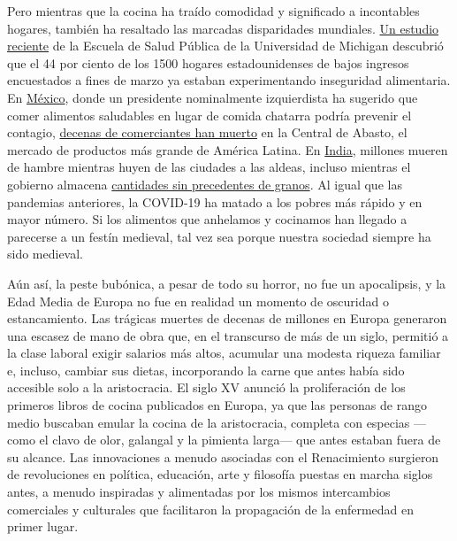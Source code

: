 Pero mientras que la cocina ha traído comodidad y significado a
incontables hogares, también ha resaltado las marcadas disparidades
mundiales.
\href{https://sph.umich.edu/news/2020posts/coronavirus-pandemic-worsens-food-insecurity-for-low-income-adults.html}{Un
estudio reciente} de la Escuela de Salud Pública de la Universidad de
Michigan descubrió que el 44 por ciento de los 1500 hogares
estadounidenses de bajos ingresos encuestados a fines de marzo ya
estaban experimentando inseguridad alimentaria. En
\href{https://www.nytimes3xbfgragh.onion/es/interactive/2020/espanol/america-latina/coronavirus-en-mexico.html}{México},
donde un presidente nominalmente izquierdista ha sugerido que comer
alimentos saludables en lugar de comida chatarra podría prevenir el
contagio,
\href{https://www.washingtonpost.com/world/2020/06/21/coronavirus-mexico-city-centro-abasto-market/?arc404=true}{decenas
de comerciantes han muerto} en la Central de Abasto, el mercado de
productos más grande de América Latina. En
\href{https://www.nytimes3xbfgragh.onion/interactive/2020/world/asia/india-coronavirus-cases.html}{India},
millones mueren de hambre mientras huyen de las ciudades a las aldeas,
incluso mientras el gobierno almacena
\href{https://www.bloomberg.com/news/articles/2020-03-24/india-has-enough-food-to-feed-poor-amid-prolonged-shutdown-fears}{cantidades
sin precedentes de granos}. Al igual que las pandemias anteriores, la
COVID-19 ha matado a los pobres más rápido y en mayor número. Si los
alimentos que anhelamos y cocinamos han llegado a parecerse a un festín
medieval, tal vez sea porque nuestra sociedad siempre ha sido medieval.

Aún así, la peste bubónica, a pesar de todo su horror, no fue un
apocalipsis, y la Edad Media de Europa no fue en realidad un momento de
oscuridad o estancamiento. Las trágicas muertes de decenas de millones
en Europa generaron una escasez de mano de obra que, en el transcurso de
más de un siglo, permitió a la clase laboral exigir salarios más altos,
acumular una modesta riqueza familiar e, incluso, cambiar sus dietas,
incorporando la carne que antes había sido accesible solo a la
aristocracia. El siglo XV anunció la proliferación de los primeros
libros de cocina publicados en Europa, ya que las personas de rango
medio buscaban emular la cocina de la aristocracia, completa con
especias ---como el clavo de olor, galangal y la pimienta larga--- que
antes estaban fuera de su alcance. Las innovaciones a menudo asociadas
con el Renacimiento surgieron de revoluciones en política, educación,
arte y filosofía puestas en marcha siglos antes, a menudo inspiradas y
alimentadas por los mismos intercambios comerciales y culturales que
facilitaron la propagación de la enfermedad en primer lugar.

